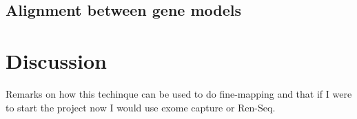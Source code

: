 



\subsection{Alignment between gene models}

\section{Discussion} 
Remarks on how this techinque can be used to do fine-mapping and that if I were to start the project now I would  use exome capture or Ren-Seq. 

